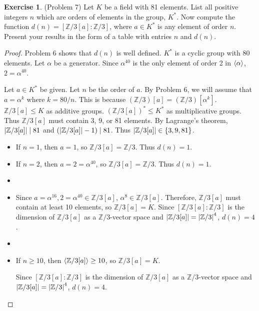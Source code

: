 \documentclass[12pt, psamsfonts]{amsart}
\theoremstyle{definition}
\newtheorem*{exer}{Exercise}
\theoremstyle{remark}
\numberwithin{equation}{section}
\begin{document}
\begin{exer}{(Problem 7)}
  Let $K$ be a field with 81 elements.
  List all positive integers $n$ which are orders of elements in the group, $K^*$.
  Now compute the function $d(n) = [\mathbb{Z}/3[a]:\mathbb{Z}/3]$, where $a \in K^*$ is any element of order $n$.
  Present your results in the form of a table with entries $n$ and $d(n)$.
\end{exer}

\begin{proof}
  Problem 6 shows that $d(n)$ is well defined.
  $K^*$ is a cyclic group with 80 elements.
  Let $\alpha$ be a generator.
  Since $\alpha^{40}$ is the only element of order 2 in $\ev{ \alpha }$, $2 = \alpha^{40}$.

  Let $a \in K^*$ be given.
  Let $n$ be the order of $a$.
  By Problem 6, we will assume that $a = \alpha^k$ where $k = 80 / n$.
  This is because $(\mathbb{Z}/3)[a] = (\mathbb{Z}/3)[\alpha^k]$.
  $\mathbb{Z}/3[a] \leq K$ as additive groups.
  $(\mathbb{Z}/3[a])^* \leq K^*$ as multiplicative groups.
  Thus $\mathbb{Z}/3[a]$ must contain 3, 9, or 81 elements.
  By Lagrange's theorem, $\abs{\mathbb{Z}/3[a]} \mid 81$ and $(\abs{\mathbb{Z}/3[a]} - 1) \mid 81$.
  Thus $\abs{\mathbb{Z}/3[a]} \in \{ 3, 9, 81 \}$.

  \begin{itemize}
    \item
      If $n = 1$, then $a = 1$, so $\mathbb{Z}/3[a] = \mathbb{Z}/3$.
      Thus $d(n) = 1$.
    \item
      If $n = 2$, then $a = 2 = \alpha^{40}$, so $\mathbb{Z}/3[a] = \mathbb{Z}/3$.
      Thus $d(n) = 1$.
    \item
    \item
      Since $a = \alpha^{16}, 2 = \alpha^{40} \in \mathbb{Z}/3[a]$, $\alpha^8 \in \mathbb{Z}/3[a]$.
      Therefore, $\mathbb{Z}/3[a]$ must contain at least 10 elements, so $\mathbb{Z}/3[a] = K$.
      Since $[\mathbb{Z}/3[a] : \mathbb{Z}/3]$ is the dimension of $\mathbb{Z}/3[a]$ as a $\mathbb{Z}/3$-vector space and $\abs{ \mathbb{Z}/3[a] } = \abs{ \mathbb{Z}/3 }^4$, $d(n) = 4$.
    \item
    \item
      If $n \geq 10$, then $\ev{ \mathbb{Z}/3[a] } \geq 10$, so $\mathbb{Z}/3[a] = K$.

      Since $[\mathbb{Z}/3[a] : \mathbb{Z}/3]$ is the dimension of $\mathbb{Z}/3[a]$ as a $\mathbb{Z}/3$-vector space and $\abs{ \mathbb{Z}/3[a] } = \abs{ \mathbb{Z}/3 }^4$, $d(n) = 4$.
  \end{itemize}


\end{proof}
\end{document}
